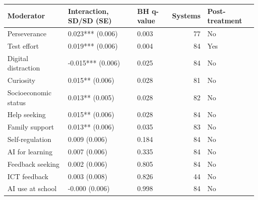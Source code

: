 \begin{tabular}{lllrl}
\toprule
Moderator & Interaction, SD/SD (SE) & BH q-value & Systems & Post-treatment \\
\midrule
Perseverance & 0.023*** (0.006) & 0.003 & 77 & No \\
Test effort & 0.019*** (0.006) & 0.004 & 84 & Yes \\
Digital distraction & -0.015*** (0.006) & 0.025 & 84 & No \\
Curiosity & 0.015** (0.006) & 0.028 & 81 & No \\
Socioeconomic status & 0.013** (0.005) & 0.028 & 82 & No \\
Help seeking & 0.015** (0.006) & 0.028 & 84 & No \\
Family support & 0.013** (0.006) & 0.035 & 83 & No \\
Self-regulation & 0.009 (0.006) & 0.184 & 84 & No \\
AI for learning & 0.007 (0.006) & 0.335 & 84 & No \\
Feedback seeking & 0.002 (0.006) & 0.805 & 84 & No \\
ICT feedback & 0.003 (0.008) & 0.826 & 44 & No \\
AI use at school & -0.000 (0.006) & 0.998 & 84 & No \\
\bottomrule
\end{tabular}

